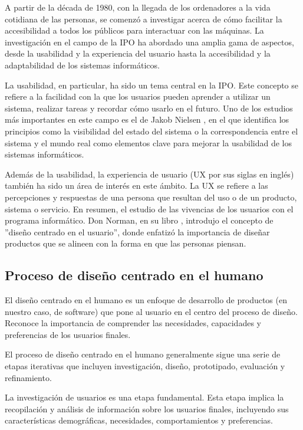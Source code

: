 A partir de la década de 1980, con la llegada de los ordenadores a la vida cotidiana de las personas, se comenzó a investigar acerca de cómo facilitar la accesibilidad a todos los públicos para interactuar con las máquinas.  La investigación en el campo de la IPO ha abordado una amplia gama de aspectos, desde la usabilidad y la experiencia del usuario hasta la accesibilidad y la adaptabilidad de los sistemas informáticos.

La usabilidad, en particular, ha sido un tema central en la IPO. Este concepto se refiere a la facilidad con la que los usuarios pueden aprender a utilizar un sistema, realizar tareas y recordar cómo usarlo en el futuro. Uno de los estudios más importantes en este campo es el de Jakob Nielsen \cite{nielsen1994usability}, en el que identifica los principios como la visibilidad del estado del sistema o la correspondencia entre el sistema y el mundo real como elementos clave para mejorar la usabilidad de los sistemas informáticos.

Además de la usabilidad, la experiencia de usuario (UX por sus siglas en inglés) también ha sido un área de interés en este ámbito. La UX se refiere a las percepciones y respuestas de una persona que resultan del uso o de un producto, sistema o servicio. En resumen, el estudio de las vivencias de los usuarios con el programa informático. Don Norman, en su libro \cite{norman2013design}, introdujo el concepto de ''diseño centrado en el usuario'', donde enfatizó la importancia de diseñar productos que se alineen con la forma en que las personas piensan.

\subsection{Proceso de diseño centrado en el humano}

El diseño centrado en el humano es un enfoque de desarrollo de productos (en nuestro caso, de software) que pone al usuario en el centro del proceso de diseño. Reconoce la importancia de comprender las necesidades, capacidades y preferencias de los usuarios finales.

El proceso de diseño centrado en el humano generalmente sigue una serie de etapas iterativas que incluyen investigación, diseño, prototipado, evaluación y refinamiento.

La investigación de usuarios es una etapa fundamental. Esta etapa implica la recopilación y análisis de información sobre los usuarios finales, incluyendo sus características demográficas, necesidades, comportamientos y preferencias.

